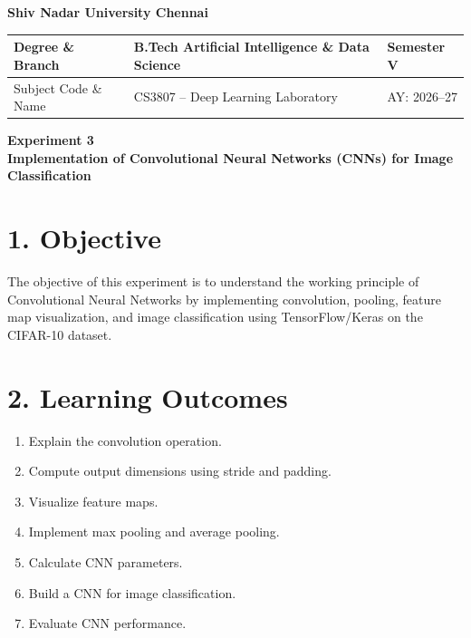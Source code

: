 \documentclass[11pt]{article}
\begin{document}
\begin{center}
\Large\textbf{Shiv Nadar University Chennai}\\[2mm]
\end{center}

\renewcommand{\arraystretch}{1.4}

\begin{tabular}{|p{3.5cm}|p{8cm}|p{2cm}|}
\hline
Degree \& Branch & B.Tech Artificial Intelligence \& Data Science & Semester V\\ \hline
Subject Code \& Name & CS3807 -- Deep Learning Laboratory & AY: 2026--27\\ \hline
\end{tabular}

\vspace{3mm}

\begin{center}
\Large\textbf{Experiment 3}\\
\large\textbf{Implementation of Convolutional Neural Networks (CNNs) for Image Classification}
\end{center}

\section*{1. Objective}

The objective of this experiment is to understand the working principle of Convolutional Neural Networks by implementing convolution, pooling, feature map visualization, and image classification using TensorFlow/Keras on the CIFAR-10 dataset.

\section*{2. Learning Outcomes}

\begin{enumerate}[leftmargin=*]
\item Explain the convolution operation.
\item Compute output dimensions using stride and padding.
\item Visualize feature maps.
\item Implement max pooling and average pooling.
\item Calculate CNN parameters.
\item Build a CNN for image classification.
\item Evaluate CNN performance.
\end{enumerate}
\end{document}
